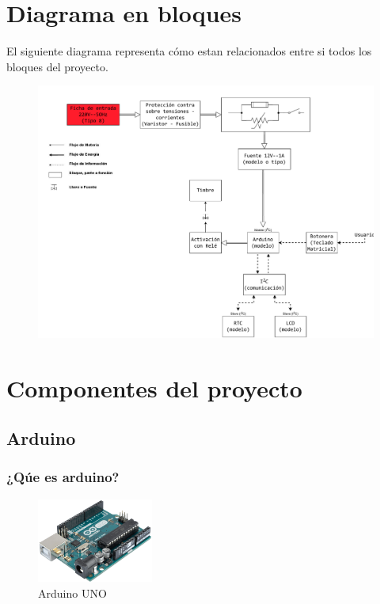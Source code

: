 \documentclass{article}
\begin{document}
\section{Diagrama en bloques}
El siguiente diagrama representa cómo estan relacionados entre si todos los bloques
del proyecto.
	\begin{figure}[H]
		\centering
		\includegraphics[width=\textwidth,keepaspectratio=true] 
		{diagrama_bloques.pdf}
	\end{figure} 


\section{Componentes del proyecto}
	\subsection{Arduino}
		\subsubsection{¿Qúe es arduino?}
		\begin{figure}
			\centering
			\includegraphics[width= 1.5in, keepaspectratio]{arduino.png}
			\caption{Arduino UNO}	
		\end{figure}
\end{document}
